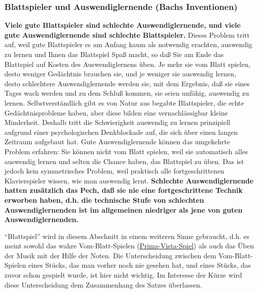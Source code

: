 
\subsubsection{Blattspieler und Auswendiglernende (Bachs Inventionen)}
\label{c1iii6l}

\textbf{Viele gute Blattspieler sind schlechte Auswendiglernende, und viele gute Auswendiglernende sind schlechte Blattspieler.}
Dieses Problem tritt auf, weil gute Blattspieler es am Anfang kaum als notwendig erachten, auswendig zu lernen und Ihnen das Blattspiel Spaß macht, so daß Sie am Ende das Blattspiel auf Kosten des Auswendiglernens üben.
Je mehr sie vom Blatt spielen, desto weniger Gedächtnis brauchen sie, und je weniger sie auswendig lernen, desto schlechtere Auswendiglernende werden sie, mit dem Ergebnis, daß sie eines Tages wach werden und zu dem Schluß kommen, sie seien unfähig, auswendig zu lernen.
Selbstverständlich gibt es von Natur aus begabte Blattspieler, die echte Gedächtnisprobleme haben, aber diese bilden eine vernachlässigbar kleine Minderheit.
Deshalb tritt die Schwierigkeit auswendig zu lernen prinzipiell aufgrund einer psychologischen Denkblockade auf, die sich über einen langen Zeitraum aufgebaut hat.
Gute Auswendiglernende können das umgekehrte Problem erfahren: Sie können nicht vom Blatt spielen, weil sie automatisch alles auswendig lernen und selten die Chance haben, das Blattspiel zu üben.
Das ist jedoch kein symmetrisches Problem, weil praktisch alle fortgeschrittenen Klavierspieler wissen, wie man auswendig lernt.
\textbf{Schlechte Auswendiglernende hatten zusätzlich das Pech, daß sie nie eine fortgeschrittene Technik erworben haben, d.h. die technische Stufe von schlechten Auswendiglernenden ist im allgemeinen niedriger als jene von guten Auswendiglernenden.}

\enquote{Blattspiel} wird in diesem Abschnitt in einem weiteren Sinne gebraucht, d.h. es meint sowohl das wahre Vom-Blatt-Spielen (\hyperref[c030530]{Prima-Vista-Spiel}) als auch das Üben der Musik mit der Hilfe der Noten.
Die Unterscheidung zwischen dem Vom-Blatt-Spielen eines Stücks, das man vorher noch nie gesehen hat, und eines Stücks, das zuvor schon gespielt wurde, ist hier nicht wichtig.
Im Interesse der Kürze wird diese Unterscheidung dem Zusammenhang des Satzes überlassen.

